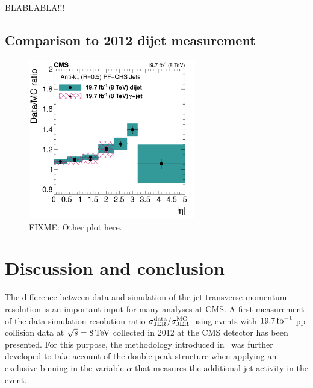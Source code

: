 BLABLABLA!!!

\section{Comparison to 2012 dijet measurement}
\label{res:sec:comparison_2012}

\begin{figure}[!b]
 \centering
    \includegraphics[width=0.65\textwidth]{figures/resolution/results/JER_2012_compPhoton_final_v2.pdf}
  \caption{FIXME: Other plot here.}
  \label{res:fig:Comparison_2011}
\end{figure}

\FloatBarrier
\chapter{Discussion and conclusion}
The difference between data and simulation of the jet-transverse momentum resolution is an important input for many analyses at CMS.
A first measurement of the data-simulation resolution ratio $\sigma_\mathrm{JER}^{\text{data}}/\sigma_\mathrm{JER}^{\text{MC}}$ using \GAMJET events with $19.7\,\text{fb}^{-1}$ pp collision data at $\sqrt{s}=8 \,\text{Te}\kern-0.06667em\text{V}$ collected in 2012 at the CMS detector has been presented. 
For this purpose, the methodology introduced in~\cite{bib:CMS:JERCPaper_2011,CMS:PAS:JETResolution_7TeV} was further developed to take account of the double peak structure when applying an exclusive binning in the variable $\alpha$ 
that measures the additional jet activity in the event.

